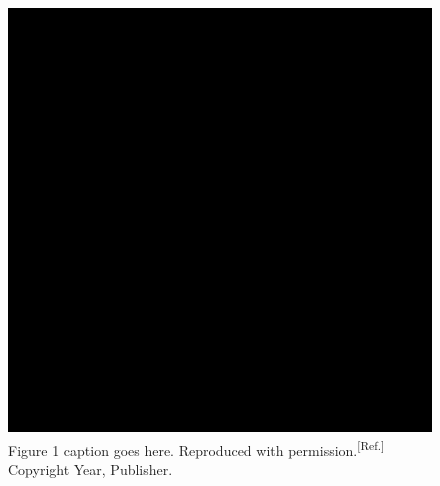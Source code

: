 \documentclass{WileyMSP-template}
\begin{document}
%	
%	
%	
%	




\begin{figure}
  \includegraphics[width=\linewidth]{placeholder-image.png}
  \caption{Figure 1 caption goes here. Reproduced with permission.\textsuperscript{[Ref.]} Copyright Year, Publisher. }
  \label{fig:boat1}
\end{figure}
\end{document}
